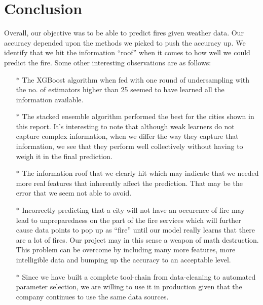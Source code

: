\documentclass[10pt]{article}
\begin{document}
\section{Conclusion}
Overall, our objective was to be able to predict fires given weather data.
Our accuracy depended upon the methods we picked to push the accuracy up.
We identify that we hit the information ``roof'' when it comes to how well
we could predict the fire. Some other interesting observations are as
follows:\par
\begin{enumerate}
    \item[$\ast$]
    The XGBoost algorithm when fed with one round of undersampling with
    the no. of estimators higher than 25 seemed to have learned all the
    information available.
    \item[$\ast$]
    The stacked ensemble algorithm performed the best for the cities shown
    in this report. It's interesting to note that although weak learners
    do not capture complex information, when we differ the way they
    capture that information, we see that they perform well collectively
    without having to weigh it in the final prediction.
    \item[$\ast$]
    The information roof that we clearly hit which may indicate that we
    needed more real features that inherently affect the prediction. That
    may be the error that we seem not able to avoid.
    \item[$\ast$]
    Incorrectly predicting that a city will not have an occurence of
    fire may lead to unpreparedness on the part of the fire services
    which will further cause data points to pop up as ``fire'' until our
    model really learns that there are a lot of fires. Our project may
    in this sense a weapon of math destruction. This problem can be 
    overcome by including many more features, more intelligible data and
    bumping up the accuracy to an acceptable level.
    \item[$\ast$]
    Since we have built a complete tool-chain from data-cleaning to
    automated parameter selection, we are willing to use it in production
    given that the company continues to use the same data sources.
\end{enumerate}
\newpage
\nocite{*}


\end{document}
